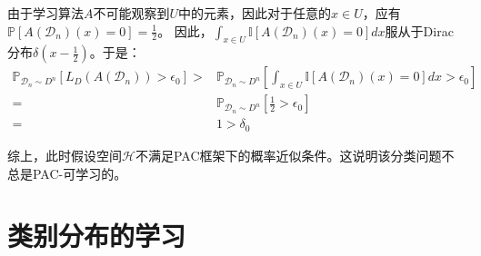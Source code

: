 \documentclass[12pt, a4paper]{article}
\newcommand{\unit}{{\mathbb{I}}}
\newcommand{\prob}{{\mathbb{P}}}
\newcommand{\HH}{{\mathcal{H}}}
\newcommand{\DD}{{\mathcal{D}}}
\begin{document}
\begin{enumerate}
        由于学习算法$A$不可能观察到$U$中的元素，因此对于任意的$x \in U$，应有$\prob[A(\DD_n)(x) = 0] = \frac{1}{2}$。
        因此，$\int_{x \in U} \unit[A(\DD_n)(x) = 0] dx$服从于Dirac分布$\delta(x - \frac{1}{2})$。于是：
        \begin{align*}
        \prob_{\DD_n \sim D^n} [L_D(A(\DD_n)) > \epsilon_0]
        >& \prob_{\DD_n \sim D^n} [\int_{x \in U} \unit[A(\DD_n)(x) = 0] dx  > \epsilon_0] \\
        =& \prob_{\DD_n \sim D^n} [\frac{1}{2} > \epsilon_0] \\
        =& 1 > \delta_0
        \end{align*}

        综上，此时假设空间$\HH$不满足PAC框架下的概率近似条件。这说明该分类问题不总是PAC-可学习的。

    \end{enumerate}

    \section{类别分布的学习}
\end{document}

